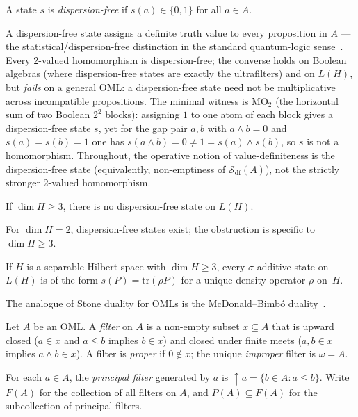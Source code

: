 \begin{definition}
A state $s$ is \emph{dispersion-free} if $s(a) \in \{0,1\}$ for
all $a \in A$.
\end{definition}

\noindent A dispersion-free state assigns a definite truth value
to every proposition in $A$ --- the statistical/dispersion-free
distinction in the standard quantum-logic
sense~\cite{BeltramettiCassinelli1981}.  Every 2-valued homomorphism is
dispersion-free; the converse holds on Boolean algebras (where
dispersion-free states are exactly the ultrafilters) and on
$L(H)$, but \emph{fails} on a general OML: a dispersion-free state
need not be multiplicative across incompatible propositions.  The
minimal witness is $\mathrm{MO}_2$ (the horizontal sum of two Boolean
$2^2$ blocks): assigning $1$ to one atom of each block gives a
dispersion-free state $s$, yet for the gap pair $a, b$ with
$a \wedge b = 0$ and $s(a) = s(b) = 1$ one has
$s(a \wedge b) = 0 \neq 1 = s(a) \wedge s(b)$, so $s$ is not a
homomorphism.  Throughout, the operative notion of value-definiteness
is the dispersion-free state (equivalently, non-emptiness of
$\mathcal{S}_{\mathrm{df}}(A)$), not the strictly stronger 2-valued
homomorphism.

\begin{theorem}
\label{thm:KS}
If $\dim H \geq 3$, there is no dispersion-free state on $L(H)$.
\end{theorem}

\noindent For $\dim H = 2$, dispersion-free states exist; the
obstruction is specific to $\dim H \geq 3$.

\begin{theorem}
\label{thm:gleason}
If $H$ is a separable Hilbert space with $\dim H \geq 3$, every
$\sigma$-additive state on $L(H)$ is of the form
$s(P) = \mathrm{tr}(\rho P)$ for a unique density operator
$\rho$ on~$H$.
\end{theorem}

The analogue of Stone duality for OMLs is the
McDonald--Bimb\'{o} duality~\cite{McDonaldBimbo2023}.

Let $A$ be an OML.  A \emph{filter} on $A$ is a non-empty subset
$x \subseteq A$ that is upward closed ($a \in x$ and $a \leq b$
implies $b \in x$) and closed under finite meets ($a, b \in x$
implies $a \wedge b \in x$).  A filter is \emph{proper} if
$0 \notin x$; the unique \emph{improper} filter is $\omega = A$.

For each $a \in A$, the \emph{principal filter} generated by $a$ is
${\uparrow}a = \{b \in A : a \leq b\}$.  Write $F(A)$ for the
collection of all filters on $A$, and $P(A) \subseteq F(A)$ for the
subcollection of principal filters.

